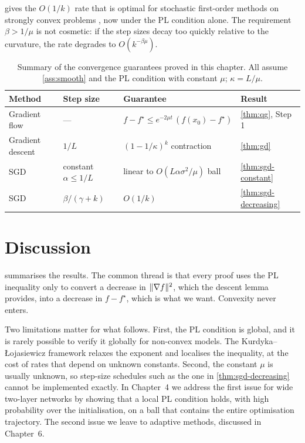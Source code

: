 \documentclass[11pt,a4paper,oneside]{report}
\theoremstyle{plain}
\theoremstyle{definition}
\theoremstyle{remark}
\DeclarePairedDelimiter{\norm}{\lVert}{\rVert}
\begin{document}
 gives the $O(1/k)$ rate that is optimal for stochastic first-order methods on strongly convex problems \citep{moulines2011,bottou2018}, now under the PL condition alone. The requirement $\beta > 1/\mu$ is not cosmetic: if the step sizes decay too quickly relative to the curvature, the rate degrades to $O(k^{-\beta\mu})$.

\begin{table}[t]
  \centering
  \caption{Summary of the convergence guarantees proved in this chapter. All assume \cref{ass:smooth} and the PL condition with constant $\mu$; $\kappa = L/\mu$.}
  \label{tab:pl-summary}
  \begin{tabular}{@{}llll@{}}
    \toprule
    Method & Step size & Guarantee & Result \\
    \midrule
    Gradient flow & --- & $f - f^\star\le e^{-2\mu t}\,(f(x_0) - f^\star)$ & \cref{thm:qg}, Step 1 \\
    Gradient descent & $1/L$ & $(1 - 1/\kappa)^k$ contraction & \cref{thm:gd} \\
    SGD & constant $\alpha\le 1/L$ & linear to $O(L\alpha\sigma^2/\mu)$ ball & \cref{thm:sgd-constant} \\
    SGD & $\beta/(\gamma + k)$ & $O(1/k)$ & \cref{thm:sgd-decreasing} \\
    \bottomrule
  \end{tabular}
\end{table}

\section{Discussion}
\label{sec:pl-discussion}

 summarises the results. The common thread is that every proof uses the PL inequality only to convert a decrease in $\norm{\nabla f}^2$, which the descent lemma provides, into a decrease in $f - f^\star$, which is what we want. Convexity never enters.

Two limitations matter for what follows. First, the PL condition is global, and it is rarely possible to verify it globally for non-convex models. The Kurdyka--{\L}ojasiewicz framework \citep{kurdyka1998,bolte2007,attouch2010} relaxes the exponent and localises the inequality, at the cost of rates that depend on unknown constants. Second, the constant $\mu$ is usually unknown, so step-size schedules such as the one in \cref{thm:sgd-decreasing} cannot be implemented exactly. In Chapter~4 we address the first issue for wide two-layer networks by showing that a local PL condition holds, with high probability over the initialisation, on a ball that contains the entire optimisation trajectory. The second issue we leave to adaptive methods, discussed in Chapter~6.



\end{document}
